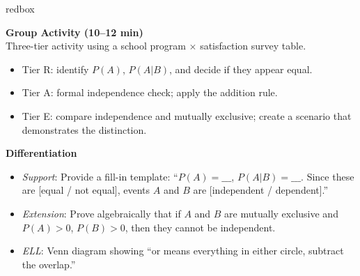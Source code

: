 \documentclass[10pt]{article}
\begin{document}
\begin{skillbox}{redbox}
\begin{minipage}[t]{0.48\linewidth}
    \textbf{Group Activity (10--12 min)}\\
    Three-tier activity using a school program $\times$ satisfaction survey table.
    \begin{itemize}
        \item Tier R: identify $P(A)$, $P(A|B)$, and decide if they appear equal.
        \item Tier A: formal independence check; apply the addition rule.
        \item Tier E: compare independence and mutually exclusive; create a
              scenario that demonstrates the distinction.
    \end{itemize}
\end{minipage}
\hfill
\begin{minipage}[t]{0.48\linewidth}
    \textbf{Differentiation}
    \begin{itemize}
        \item \textit{Support}: Provide a fill-in template: ``$P(A) = \_\_\_$,
              $P(A|B) = \_\_\_$. Since these are [equal / not equal], events $A$
              and $B$ are [independent / dependent].''
        \item \textit{Extension}: Prove algebraically that if $A$ and $B$ are
              mutually exclusive and $P(A) > 0$, $P(B) > 0$, then they cannot be
              independent.
        \item \textit{ELL}: Venn diagram showing ``or means everything in either
              circle, subtract the overlap.''
    \end{itemize}
\end{minipage}
\end{skillbox}
\end{document}
